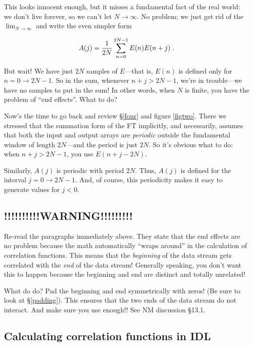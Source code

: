 \documentclass[psfig,preprint]{aastex}
\begin{document}
        This looks innocent enough, but it misses a fundamental fact of
the real world: we don't live forever, so we can't let $N \rightarrow
\infty$.  No problem; we just get rid of the $\lim_{N \to \infty}$ and  
write the even simpler form

\begin{equation}
A(j) = {1 \over 2N} \sum_{n=0}^{2N-1} E(n) E(n + j) \; .
\end{equation}

\noindent But wait! We have just $2N$ samples of $E$---that is, $E(n)$
is defined only for $n = 0 \rightarrow 2N-1$.  So in the sum, whenever
$n+j > 2N-1$, we're in trouble---we have no samples to put in the sum!
In other words, when $N$ is finite, you have the problem of ``end
effects''.  What to do?

        Now's the time to go back and review \S \ref{four} and figure
\ref{figtwo}. There we stressed that the summation form of the FT
implicitly, and necessarily, assumes that both the input and output
arrays are {\it periodic} outside the fundamental window of  length
$2N$---and the period is just $2N$.  So it's obvious what to do: when
$n+j > 2N-1$, you use $E(n+j-2N)$.

        Similarly, $A(j)$ is periodic with period $2N$.  Thus, $A(j)$ is
defined for the interval $j = 0 \rightarrow 2N-1$. And, of course, this
periodicity makes it easy to generate values for $j < 0$.
        
\subsection{!!!!!!!!!!WARNING!!!!!!!!!}

	Re-read the paragraphs immediately above. They state that the
end effects are no problem because the math automatically ``wraps
around'' in the calculation of correlation functions. This means that
the {\it beginning} of the data stream gets correlated with the {\it
end} of the data stream! Generally speaking, you don't want this to
happen because the beginning and end are distinct and totally unrelated!

	What do do? Pad the beginning and end symmetrically with zeros!
(Be sure to look at \S \ref{padding}). This ensures that the two ends of
the data stream do not interact. And make sure you use enough!! See NM
discussion \S 13.1. 

\subsection{Calculating correlation functions in IDL}
\end{document}

